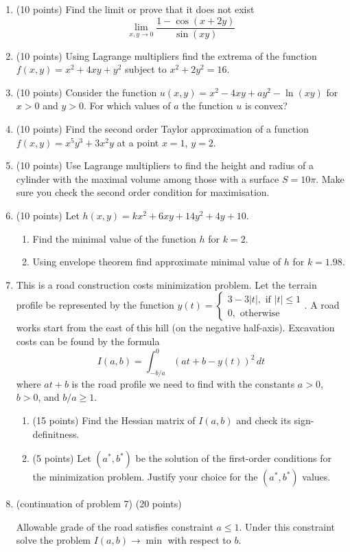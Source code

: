 \begin{enumerate}
  \item (10 points) Find the limit or prove that it does not exist
  \[
  \lim_{x,y \to 0} \frac{1 - \cos(x+2y)}{\sin(xy)}
  \]

  \item (10 points) Using Lagrange multipliers find the extrema of the function $f(x,y) = x^2 + 4xy + y^2$ subject to $x^2 + 2y^2 = 16$.

 \item (10 points) Consider the function $u(x,y) = x^2 - 4xy + ay^2 -\ln(xy)$ for $x>0$ and $y>0$.
 For which values of $a$ the function $u$ is convex?

 \item (10 points) Find the second order Taylor approximation of a function $f(x,y) = x^5y^3 + 3x^2y$ at a point $x=1$, $y=2$.

  \item (10 points) Use Lagrange multipliers to find the height and radius of a cylinder
  with the maximal volume among those with a surface $S=10\pi$. Make sure you check the second order
condition for maximisation.

  \item (10 points) Let $h(x, y) = kx^2 + 6xy + 14y^2 + 4y + 10$.
  \begin{enumerate}
    \item Find the minimal value of the function $h$ for $k=2$.
    \item Using envelope theorem find approximate minimal value of $h$ for $k=1.98$.
  \end{enumerate}


\item This is a road construction costs minimization problem. Let the terrain profile be represented by the function $y(t)=\begin{cases}
3-3|t|, \text{ if } |t|\leq 1\\
0, \text{ otherwise}
\end{cases}$.
A road works start from the east of this hill (on the negative half-axis). Excavation costs can be found by the formula
\[
I(a, b) = \int_{-b/a}^0 (at + b - y(t))^2 \, dt
\]
where $at+b$  is the road profile we need to find with the constants $a>0$, $b>0$, and $b/a\geq 1$.
\begin{enumerate}
  \item (15 points) Find the Hessian matrix of $I(a,b)$ and check its sign-definitness.
  \item (5 points) Let $(a^*, b^*)$ be the solution of the first-order conditions for the minimization problem.
  Justify your choice for the $(a^*, b^*)$ values.
\end{enumerate}

\item (continuation of problem 7) (20 points)

Allowable grade of the road satisfies constraint $a\leq 1$. Under this constraint solve the problem $I(a, b) \to \min$ with respect to $b$.

\end{enumerate}



